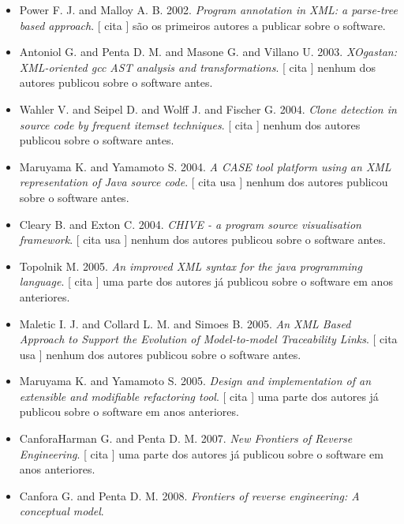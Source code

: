 \begin{itemize}
\item Power F. J. and Malloy A. B.
      2002.
        \textit{ Program annotation in XML: a parse-tree based approach}.
      [
          cita
      ]
são os primeiros autores a publicar sobre o software.
\item Antoniol G. and Penta D. M. and Masone G. and Villano U.
      2003.
        \textit{ XOgastan: XML-oriented gcc AST analysis and transformations}.
      [
          cita
      ]
nenhum dos autores publicou sobre o software antes.
\item Wahler V. and Seipel D. and Wolff J. and Fischer G.
      2004.
        \textit{ Clone detection in source code by frequent itemset techniques}.
      [
          cita
      ]
nenhum dos autores publicou sobre o software antes.
\item Maruyama K. and Yamamoto S.
      2004.
        \textit{ A CASE tool platform using an XML representation of Java source code}.
      [
          cita
          usa
      ]
nenhum dos autores publicou sobre o software antes.
\item Cleary B. and Exton C.
      2004.
        \textit{ CHIVE - a program source visualisation framework}.
      [
          cita
          usa
      ]
nenhum dos autores publicou sobre o software antes.
\item Topolnik M.
      2005.
        \textit{ An improved XML syntax for the java programming language}.
      [
          cita
      ]
uma parte dos autores já publicou sobre o software em anos anteriores.
\item Maletic I. J. and Collard L. M. and Simoes B.
      2005.
        \textit{ An XML Based Approach to Support the Evolution of Model-to-model Traceability Links}.
      [
          cita
          usa
      ]
nenhum dos autores publicou sobre o software antes.
\item Maruyama K. and Yamamoto S.
      2005.
        \textit{ Design and implementation of an extensible and modifiable refactoring tool}.
      [
          cita
      ]
uma parte dos autores já publicou sobre o software em anos anteriores.
\item CanforaHarman G. and Penta D. M.
      2007.
        \textit{ New Frontiers of Reverse Engineering}.
      [
          cita
      ]
uma parte dos autores já publicou sobre o software em anos anteriores.
\item Canfora G. and Penta D. M.
      2008.
        \textit{ Frontiers of reverse engineering: A conceptual model}.

\end{itemize}
